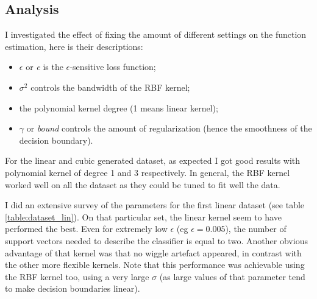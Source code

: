 \documentclass[11pt, a4paper]{article}
\begin{document}
\subsection{Analysis}

I investigated the effect of fixing the amount of different settings
on the function estimation, here is their descriptions:

\begin{itemize}
\item $\epsilon$ or \emph{e} is the $\epsilon$-sensitive loss
  function;
\item $\sigma^2$ controls the bandwidth of the RBF kernel;
\item the polynomial kernel degree (1 means linear kernel);
\item $\gamma$ or \emph{bound} controls the amount of regularization
  (hence the smoothness of the decision boundary).
\end{itemize}

For the linear and cubic generated dataset, as expected I got good
results with polynomial kernel of degree 1 and 3 respectively. In
general, the RBF kernel worked well on all the dataset as they could
be tuned to fit well the data.

I did an extensive survey of the parameters for the first linear
dataset (see table \ref{table:dataset_lin}). On that particular set,
the linear kernel seem to have performed the best. Even for extremely
low $\epsilon$ (eg $\epsilon=0.005$), the number of support vectors
needed to describe the classifier is equal to two. Another obvious
advantage of that kernel was that no wiggle artefact appeared, in
contrast with the other more flexible kernels. Note that this
performance was achievable using the RBF kernel too, using a very
large $\sigma$ (as large values of that parameter tend to make
decision boundaries linear).
\end{document}
